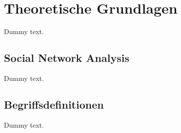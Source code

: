 \chapter{Theoretische Grundlagen}

Dummy text.

\section{Social Network Analysis}

Dummy text.

\section{Begriffsdefinitionen}

Dummy text.